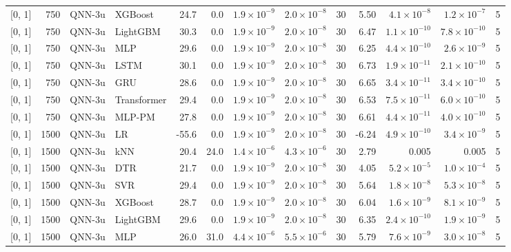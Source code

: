 \begin{longtable}{lrllrrrrrrrrr}
{[0, 1]} & 750 & QNN-3u & XGBoost & 24.7 & 0.0 & $1.9 \times 10^{-9}$ & $2.0 \times 10^{-8}$ & 30 & 5.50 & $4.1 \times 10^{-8}$ & $1.2 \times 10^{-7}$ & 5 \\
{[0, 1]} & 750 & QNN-3u & LightGBM & 30.3 & 0.0 & $1.9 \times 10^{-9}$ & $2.0 \times 10^{-8}$ & 30 & 6.47 & $1.1 \times 10^{-10}$ & $7.8 \times 10^{-10}$ & 5 \\
{[0, 1]} & 750 & QNN-3u & MLP & 29.6 & 0.0 & $1.9 \times 10^{-9}$ & $2.0 \times 10^{-8}$ & 30 & 6.25 & $4.4 \times 10^{-10}$ & $2.6 \times 10^{-9}$ & 5 \\
{[0, 1]} & 750 & QNN-3u & LSTM & 30.1 & 0.0 & $1.9 \times 10^{-9}$ & $2.0 \times 10^{-8}$ & 30 & 6.73 & $1.9 \times 10^{-11}$ & $2.1 \times 10^{-10}$ & 5 \\
{[0, 1]} & 750 & QNN-3u & GRU & 28.6 & 0.0 & $1.9 \times 10^{-9}$ & $2.0 \times 10^{-8}$ & 30 & 6.65 & $3.4 \times 10^{-11}$ & $3.4 \times 10^{-10}$ & 5 \\
{[0, 1]} & 750 & QNN-3u & Transformer & 29.4 & 0.0 & $1.9 \times 10^{-9}$ & $2.0 \times 10^{-8}$ & 30 & 6.53 & $7.5 \times 10^{-11}$ & $6.0 \times 10^{-10}$ & 5 \\
{[0, 1]} & 750 & QNN-3u & MLP-PM & 27.8 & 0.0 & $1.9 \times 10^{-9}$ & $2.0 \times 10^{-8}$ & 30 & 6.61 & $4.4 \times 10^{-11}$ & $4.0 \times 10^{-10}$ & 5 \\
\midrule
{[0, 1]} & 1500 & QNN-3u & LR & -55.6 & 0.0 & $1.9 \times 10^{-9}$ & $2.0 \times 10^{-8}$ & 30 & -6.24 & $4.9 \times 10^{-10}$ & $3.4 \times 10^{-9}$ & 5 \\
{[0, 1]} & 1500 & QNN-3u & kNN & 20.4 & 24.0 & $1.4 \times 10^{-6}$ & $4.3 \times 10^{-6}$ & 30 & 2.79 & 0.005 & 0.005 & 5 \\
{[0, 1]} & 1500 & QNN-3u & DTR & 21.7 & 0.0 & $1.9 \times 10^{-9}$ & $2.0 \times 10^{-8}$ & 30 & 4.05 & $5.2 \times 10^{-5}$ & $1.0 \times 10^{-4}$ & 5 \\
{[0, 1]} & 1500 & QNN-3u & SVR & 29.4 & 0.0 & $1.9 \times 10^{-9}$ & $2.0 \times 10^{-8}$ & 30 & 5.64 & $1.8 \times 10^{-8}$ & $5.3 \times 10^{-8}$ & 5 \\
{[0, 1]} & 1500 & QNN-3u & XGBoost & 28.7 & 0.0 & $1.9 \times 10^{-9}$ & $2.0 \times 10^{-8}$ & 30 & 6.04 & $1.6 \times 10^{-9}$ & $8.1 \times 10^{-9}$ & 5 \\
{[0, 1]} & 1500 & QNN-3u & LightGBM & 29.6 & 0.0 & $1.9 \times 10^{-9}$ & $2.0 \times 10^{-8}$ & 30 & 6.35 & $2.4 \times 10^{-10}$ & $1.9 \times 10^{-9}$ & 5 \\
{[0, 1]} & 1500 & QNN-3u & MLP & 26.0 & 31.0 & $4.4 \times 10^{-6}$ & $5.5 \times 10^{-6}$ & 30 & 5.79 & $7.6 \times 10^{-9}$ & $3.0 \times 10^{-8}$ & 5 \\

\end{longtable}
